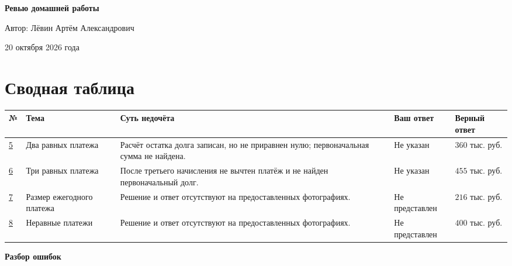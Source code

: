 \documentclass[12pt,a4paper]{article}
\newcommand{\rate}{\text{ тыс. руб.}}
\begin{document}
\begin{titlepage}
\centering
\vspace*{0.28\textheight}
{\Huge\bfseries Ревью домашней работы\par}
\vspace{2.5cm}
{\large Автор: Лёвин Артём Александрович\par}
\vspace{0.7cm}
{\large 20 октября 2026 года\par}
\vfill
{}
\end{titlepage}

\section*{Сводная таблица}
\small
\begin{longtable}{@{}p{0.85cm}p{2.65cm}p{5.8cm}p{2.15cm}p{2.2cm}@{}}
\toprule
\textbf{№} & \textbf{Тема} & \textbf{Суть недочёта} & \textbf{Ваш ответ} & \textbf{Верный ответ} \\
\midrule
\endhead
\hyperref[task:5]{5} & Два равных платежа & Расчёт остатка долга записан, но не приравнен нулю; первоначальная сумма не найдена. & Не указан & $360\rate$ \\
\addlinespace
\hyperref[task:6]{6} & Три равных платежа & После третьего начисления не вычтен платёж и не найден первоначальный долг. & Не указан & $455\rate$ \\
\addlinespace
\hyperref[task:7]{7} & Размер ежегодного платежа & Решение и ответ отсутствуют на предоставленных фотографиях. & Не представлен & $216\rate$ \\
\addlinespace
\hyperref[task:8]{8} & Неравные платежи & Решение и ответ отсутствуют на предоставленных фотографиях. & Не представлен & $400\rate$ \\
\bottomrule
\end{longtable}
\normalsize

\clearpage
\thispagestyle{empty}
\vspace*{\fill}
\begin{center}
{\LARGE\bfseries Разбор ошибок}
\end{center}
\vspace*{\fill}

\clearpage
{}\label{task:5}
\end{document}
